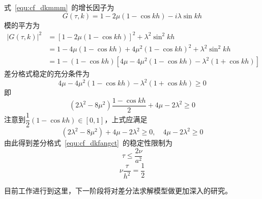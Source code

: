 \documentclass[a4paper,cs4size,adobefonts,fancyhdr]{ctexart}[2005/11/25]
\numberwithin{equation}{section} %
\begin{document}
式~\ref{equ:cf_dkmmm}~的增长因子为
\begin{equation}
	G(\tau,k)=1-2\mu(1-\cos kh)-i\lambda\sin kh
\end{equation}
模的平方为
\begin{equation}
\begin{aligned}
	|G(\tau,k)|^2 &= [1-2\mu(1-\cos kh)]^2+\lambda^2\sin^2 kh\\
				  &= 1-4\mu(1-\cos kh)+4\mu^2(1-\cos kh)^2+\lambda^2\sin^2 kh\\
				  &= 1-(1-\cos kh)[4\mu-4\mu^2(1-\cos kh)-\lambda^2(1+\cos kh)]
\end{aligned}				  
\end{equation}
差分格式稳定的充分条件为
\begin{equation}
4\mu-4\mu^2(1-\cos kh)-\lambda^2(1+\cos kh) \geq 0
\end{equation}
即
\begin{equation}
(2\lambda^2-8\mu^2)\dfrac{1-\cos kh}{2}+4\mu-2\lambda^2 \geq 0
\end{equation}
注意到$\dfrac{1}{2}(1-\cos kh)\in[0,1]$，上式应满足
\begin{equation}
(2\lambda^2-8\mu^2)+4\mu-2\lambda^2 \geq 0,\quad 4\mu-2\lambda^2 \geq 0
\end{equation}
由此得到差分格式~\ref{equ:cf_dkfangct}~的稳定性限制为
\begin{equation}
\tau \leq \dfrac{2\nu}{a^2}
\end{equation}
\begin{equation}
\nu\dfrac{\tau}{h^2}=\dfrac{1}{2}
\end{equation}\par
目前工作进行到这里，下一阶段将对差分法求解模型做更加深入的研究。
\end{document}
